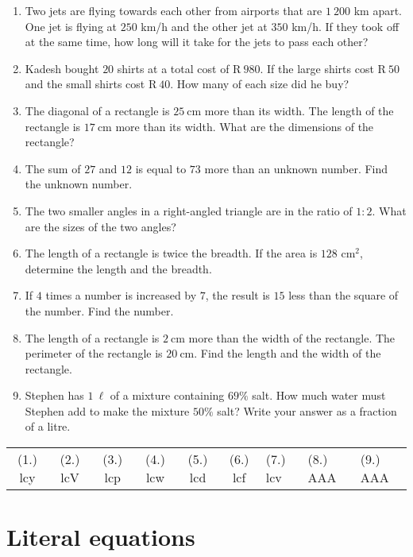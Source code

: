 \begin{exercises}{}
{
\begin{enumerate}[noitemsep, label=\textbf{\arabic*}. ] 
\item Two jets are flying towards each other from airports that are $1~200$ km apart. One jet is flying at $250$ km/h and the other jet at $350$ km/h. If they took off at the same time, how long will it take for the jets to pass each other?
\item Kadesh bought $20$ shirts at a total cost of R$~980$. If the
  large shirts cost R$~50$ and the small shirts cost R$~40$. How many
  of each size did he buy?
\item The diagonal of a rectangle is $25~$cm more than its width. The length of the rectangle is $17~$cm more than its width. What are the dimensions of the rectangle?  
\item The sum of $27$ and $12$ is equal to $73$ more than an unknown number. Find the unknown number.
\item The two smaller angles in a right-angled triangle are in the ratio of $1:2$. What are the sizes of the two angles? 
\item The length of a rectangle is twice the breadth. If the area is $128$ cm$^{2}$, determine the length and the breadth.       
\item If $4$ times a number is increased by $7$, the result is $15$ less than the square of the number. Find the number.
\item The length of a rectangle is $2~$cm more than the width of the rectangle. The perimeter of the rectangle is $20~$cm. Find the length and the width of the rectangle.
\item Stephen has $1~\ell{}$ of a mixture containing $69\%$ salt. How much water must Stephen add to make the mixture $50\%$ salt? Write your answer as a fraction of a litre.
       
\end{enumerate}
\practiceinfo
\par 
\par \begin{tabular}[h]{cccccc}
(1.) lcy  &  (2.) lcV  &  (3.) lcp  &  (4.) lcw  &  (5.) lcd  &  (6.) lcf  &  (7.) lcv  & (8.) AAA & (9.) AAA \end{tabular}
}
\end{exercises}

\section{Literal equations}

